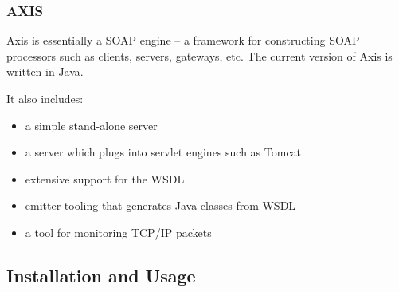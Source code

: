 \documentclass{beamer}
\begin{document}
\begin{frame}
\frametitle{AXIS}
Axis is essentially a SOAP engine -- a framework for 
constructing SOAP processors such as clients, servers, 
gateways, etc. The current version of Axis is written in Java.

It also includes:
\begin{itemize}
  \item a simple stand-alone server
  \item a server which plugs into servlet engines such as Tomcat
  \item extensive support for the WSDL
  \item emitter tooling that generates Java classes from WSDL
  \item a tool for monitoring TCP/IP packets
\end{itemize}
\end{frame}

\subsection[Short First Subsection Name]{Installation and Usage}
\end{document}
